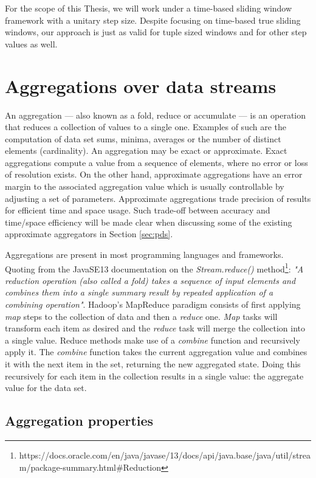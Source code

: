 For the scope of this Thesis, we will work under a time-based sliding window framework with a unitary step size. Despite focusing on time-based true sliding windows, our approach is just as valid for tuple sized windows and for other step values as well.

\section{Aggregations over data streams} \label{sec:aggregations}

An aggregation --- also known as a fold, reduce or accumulate --- is an operation that reduces a collection of values to a single one. Examples of such are the computation of data set sums, minima, averages or the number of distinct elements (cardinality). An aggregation may be exact or approximate. Exact aggregations compute a value from a sequence of elements, where no error or loss of resolution exists. On the other hand, approximate aggregations have an error margin to the associated aggregation value which is usually controllable by adjusting a set of parameters. Approximate aggregations trade precision of results for efficient time and space usage. Such trade-off between accuracy and time/space efficiency will be made clear when discussing some of the existing approximate aggregators in Section \ref{sec:pds}.

Aggregations are present in most programming languages and frameworks. Quoting from the JavaSE13 documentation on the \textit{Stream.reduce()} method\footnote{https://docs.oracle.com/en/java/javase/13/docs/api/java.base/java/util/stream/package-summary.html\#Reduction}: \textit{"A reduction operation (also called a fold) takes a sequence of input elements and combines them into a single summary result by repeated application of a combining operation"}. Hadoop's MapReduce paradigm consists of first applying \textit{map} steps to the collection of data and then a \textit{reduce} one. \textit{Map} tasks will transform each item as desired and the \textit{reduce} task will merge the collection into a single value. Reduce methods make use of a \textit{combine} function and recursively apply it. The \textit{combine} function takes the current aggregation value and combines it with the next item in the set, returning the new aggregated state. Doing this recursively for each item in the collection results in a single value: the aggregate value for the data set.

\subsection{Aggregation properties}
\label{sec:agg-properties}

